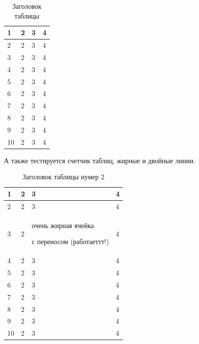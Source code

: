 \documentclass[a4paper,article,14pt]{extarticle}
\begin{document}
    \begin{center}
        \begin{longtable}{|p{2cm}|p{3cm}|p{7cm}|p{3cm}|}
            \caption{Заголовок таблицы} \\
            \hline
            1  & 2 & 3 & 4 \\
            \hline
            2  & 2 & 3 & 4 \\
            \hline
            3  & 2 & 3 & 4 \\
            \hline
            4  & 2 & 3 & 4 \\
            \hline
            5  & 2 & 3 & 4 \\
            \hline
            6  & 2 & 3 & 4 \\
            \hline
            7  & 2 & 3 & 4 \\
            \hline
            8  & 2 & 3 & 4 \\
            \hline
            9  & 2 & 3 & 4 \\
            \hline
            10 & 2 & 3 & 4 \\
            \hline


        \end{longtable}
    \end{center}


    А также тестируется счетчик таблиц, жирные и двойные линии.

    \begin{center}
        \begin{longtable}{|p{2cm}||p{3cm}|p{7cm}|p{3cm}|}
            \caption{Заголовок таблицы нумер 2} \\
            \hline
            1  & 2 & 3                                                  & 4 \\
            \hline
            2  & 2 & 3                                                  & 4 \\
            \hline
            3  & 2 & очень жирная ячейка \par с переносом (работаеттт!) & 4 \\
            \hline
            4  & 2 & 3                                                  & 4 \\
            \hline
            5  & 2 & 3                                                  & 4 \\
            \hline
            6  & 2 & 3                                                  & 4 \\
            \hline
            7  & 2 & 3                                                  & 4 \\
            \hline
            8  & 2 & 3                                                  & 4 \\
            \hline
            9  & 2 & 3                                                  & 4 \\
            \hline
            10 & 2 & 3                                                  & 4 \\
            \hline


        \end{longtable}
    \end{center}
\end{document}

